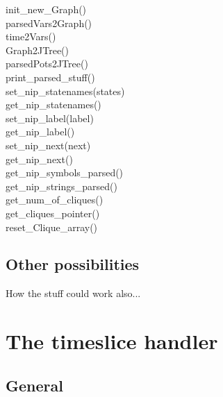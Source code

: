 \documentclass[12pt,a4paper]{report}
\begin{document}
\begin{description}
\item[init\_new\_Graph()]

\item[parsedVars2Graph()]

\item[time2Vars()]

\item[Graph2JTree()]

\item[parsedPots2JTree()]

\item[print\_parsed\_stuff()]

\item[set\_nip\_statenames(states)]

\item[get\_nip\_statenames()]

\item[set\_nip\_label(label)]

\item[get\_nip\_label()]

\item[set\_nip\_next(next)]

\item[get\_nip\_next()]

\item[get\_nip\_symbols\_parsed()]

\item[get\_nip\_strings\_parsed()]

\item[get\_num\_of\_cliques()]

\item[get\_cliques\_pointer()]

\item[reset\_Clique\_array()]

\end{description}

\subsection{Other possibilities}

How the stuff could work also...


\newpage
\section{The timeslice handler} %
\subsection{General}
\end{document}
